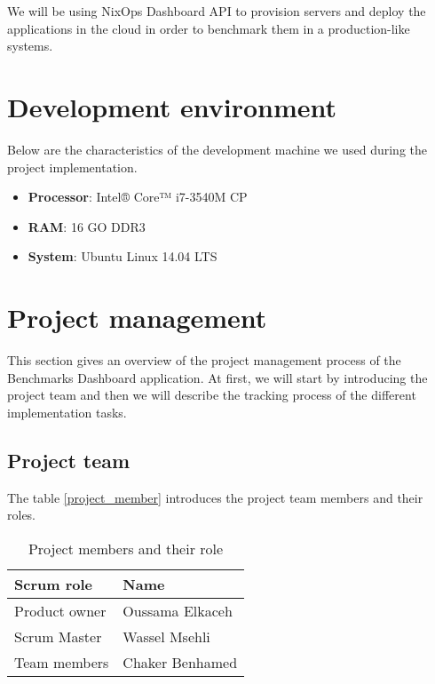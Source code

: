We will be using NixOps Dashboard API to provision servers and deploy the
applications in the cloud in order to benchmark them in a production-like
systems.

\section{Development environment}
Below are the characteristics of the development machine we used during the
project implementation.

\begin{itemize}
  \item{\textbf{Processor}: Intel® Core™ i7-3540M CP}
  \item{\textbf{RAM}: 16 GO DDR3 }
  \item{\textbf{System}: Ubuntu Linux 14.04 LTS}
\end{itemize}


\section{Project management}
This section gives an overview of the project management process of the
Benchmarks Dashboard application. At first, we will start by introducing the
project team and then we will describe the tracking process of the different
implementation tasks.
\subsection{Project team}
The table \hyperref[project_members]{\ref{project_member}} introduces the project team members and their roles.

\begin{table}[]
\centering
\label{project_members}
  \begin{tabular}{ | p{3cm}  | p{6cm} |}
    \hline

    Scrum role    & Name          \\ \hline

    Product owner & Oussama Elkaceh \\ \hline
    Scrum Master  & Wassel Msehli   \\ \hline
    Team members  & Chaker Benhamed \\ \hline

    \hline
  \end{tabular}
\caption{Project members and their role}
\end{table}

